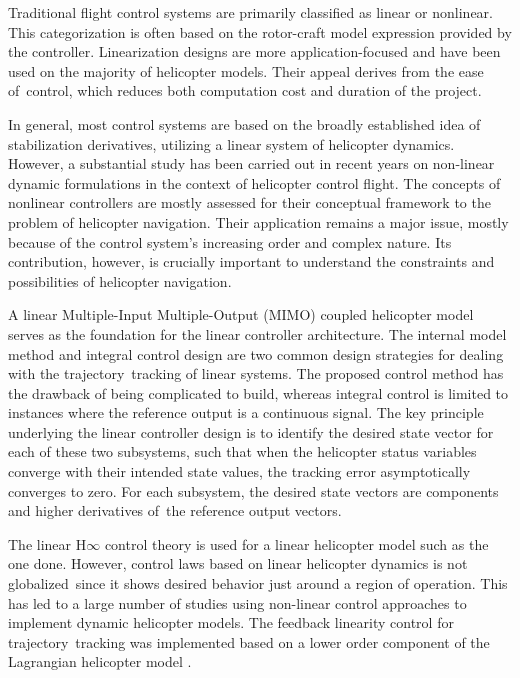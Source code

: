 Traditional flight control systems are primarily classified as linear or nonlinear. This categorization is often based on the rotor-craft model expression provided by the controller. Linearization designs are more application-focused and have been used on the majority of helicopter models. Their appeal derives from the ease of control, which reduces both computation cost and duration of the project. 

In general, most control systems are based on the broadly established idea of stabilization derivatives, utilizing a linear system of helicopter dynamics. However, a substantial study has been carried out in recent years on non-linear dynamic formulations in the context of helicopter control flight. The concepts of nonlinear controllers are mostly assessed for their conceptual framework to the problem of helicopter navigation. Their application remains a major issue, mostly because of the control system's increasing order and complex nature. Its contribution, however, is crucially important to understand the constraints and possibilities of helicopter navigation.

A linear Multiple-Input Multiple-Output (MIMO) coupled helicopter model serves as the foundation for the linear controller architecture. The internal model method and integral control design are two common design strategies for dealing with the trajectory tracking of linear systems. The proposed control method has the drawback of being complicated to build, whereas integral control is limited to instances where the reference output is a continuous signal. The key principle underlying the linear controller design is to identify the desired state vector for each of these two subsystems, such that when the helicopter status variables converge with their intended state values, the tracking error asymptotically converges to zero. For each subsystem, the desired state vectors are components and higher derivatives of the reference output vectors. 

The linear H$\infty$ control theory is used for a linear helicopter model such as the one done. However, control laws based on linear helicopter dynamics is not globalized since it shows desired behavior just around a region of operation. This has led to a large number of studies using non-linear control approaches to implement dynamic helicopter models. The feedback linearity control for trajectory tracking was implemented based on a lower order component of the Lagrangian helicopter model \cite{vilchis2003nonlinear}. 


